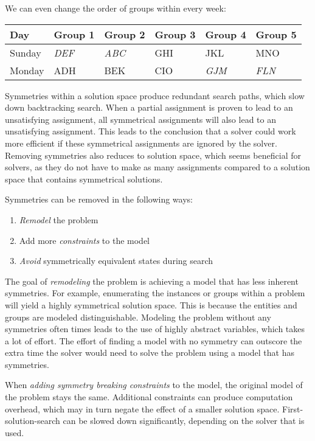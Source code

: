 \documentclass[a4paper]{scrartcl}
\begin{document}
We can even change the order of groups within every week:

\begin{table}[h]
\centering
\begin{tabular}{ l | l  l  l l  l }
Day & Group 1 & Group 2 & Group 3 & Group 4 & Group 5 \\
\hline
Sunday & \emph{DEF} & \emph{ABC} & GHI & JKL & MNO \\
Monday & ADH  & BEK & CIO & \emph{GJM} & \emph{FLN}\\
\end{tabular}
\end{table}

Symmetries within a solution space produce redundant search paths, which slow down backtracking search. When a partial assignment is proven to lead to an unsatisfying assignment, all symmetrical assignments will also lead to an unsatisfying assignment. This leads to the conclusion that a solver could work more efficient if these symmetrical assignments are ignored by the solver. Removing symmetries also reduces to solution space, which seems beneficial for solvers, as they do not have to make as many assignments compared to a solution space that contains symmetrical solutions.


Symmetries can be removed in the following ways:

\begin{enumerate}
\item \emph{Remodel} the problem
\item Add more \emph{constraints} to the model
\item \emph{Avoid} symmetrically equivalent states during search
\end{enumerate}

The goal of \emph{remodeling} the problem is achieving a model that has less inherent symmetries. For example, enumerating the instances or groups within a problem will yield a highly symmetrical solution space. This is because the entities and groups are modeled distinguishable. Modeling the problem without any symmetries often times leads to the use of highly abstract variables, which takes a lot of effort. The effort of finding a model with no symmetry can outscore the extra time the solver would need to solve the problem using a model that has symmetries.

When \emph{adding symmetry breaking constraints} to the model, the original model of the problem stays the same. Additional constraints can produce computation overhead, which may in turn negate the effect of a smaller solution space. First-solution-search can be slowed down significantly, depending on the solver that is used\cite{Prestwich}.
\end{document}
